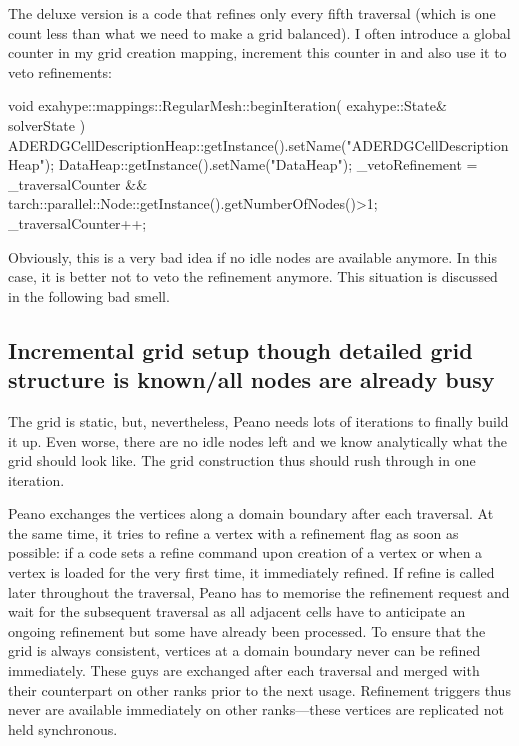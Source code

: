 The deluxe version is a code that refines only every fifth traversal (which is
one count less than what we need to make a grid balanced). 
I often introduce a global counter in my grid creation mapping, increment this
counter in  and also use it to veto refinements:
\begin{code}
void exahype::mappings::RegularMesh::beginIteration(
  exahype::State& solverState
) {
  ADERDGCellDescriptionHeap::getInstance().setName("ADERDGCellDescriptionHeap");
  DataHeap::getInstance().setName("DataHeap");
  _vetoRefinement = _traversalCounter%
                 && tarch::parallel::Node::getInstance().getNumberOfNodes()>1;
  _traversalCounter++;
}
\end{code} 
\noindent
Obviously, this is a very bad idea if no idle nodes are available anymore. 
In this case, it is better not to veto the refinement anymore.
This situation is discussed in the following bad smell. 



\subsection{Incremental grid setup though detailed grid structure is
known/all nodes are already busy}


\begin{smell}
The grid is static, but, nevertheless, Peano needs lots of iterations to finally
build it up. Even worse, there are no idle nodes left and we know analytically
what the grid should look like.
The grid construction thus should rush through in one iteration.
\end{smell}


\noindent
Peano exchanges the vertices along a domain boundary after each traversal.
At the same time, it tries to refine a vertex with a refinement flag as soon as
possible: 
if a code sets a refine command upon creation of a vertex or when a vertex is
loaded for the very first time, it immediately refined.
If refine is called later throughout the traversal, Peano has to memorise the 
refinement request and wait for the subsequent traversal as all adjacent cells
have to anticipate an ongoing refinement but some have already been processed.
To ensure that the grid is always consistent, vertices at a domain boundary
never can be refined immediately. 
These guys are exchanged after each traversal and merged with their counterpart
on other ranks prior to the next usage. 
Refinement triggers thus never are available immediately on other ranks---these
vertices are replicated not held synchronous.

